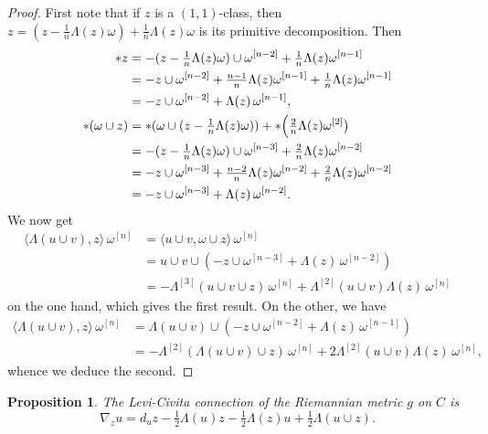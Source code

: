 \documentclass[11pt,a4paper]{amsart}
\newtheorem{prop}[theo]{Proposition}
\theoremstyle{definition}
\theoremstyle{remark}
\def\levi{\nabla}
\def\kf{\omega}
\def\Lef{\Lambda}
\def\ton{u}
\def\ttw{v}
\def\tth{z}
\def\^#1{^{[#1]}}
\def\KC{C}
\begin{document}
\begin{proof}
First note that if $\tth$ is a $(1,1)$-class, then $\tth = (\tth -
\frac1n \Lef(\tth)\kf) + \frac1n \Lef(\tth) \kf$ is its primitive
decomposition. Then
\begin{align*}
* \tth 
&= -(\tth - \tfrac1n \Lef(\tth)\kf) \cup \kf\^{n-2}
+ \tfrac1n \Lef(\tth) \kf\^{n-1}
\\
&= -\tth \cup \kf\^{n-2}
+ \tfrac{n-1}{n} \Lef(\tth) \kf\^{n-1}
+ \tfrac1n \Lef(\tth) \kf\^{n-1}
\\
&= -\tth \cup \kf\^{n-2} + \Lef(\tth)\, \kf\^{n-1},
\\
*(\kf \cup \tth)
&= *( \kf \cup (\tth - \tfrac1n \Lef(\tth)\kf))
+ * \Bigl( \tfrac{2}{n} \Lef(\tth) \kf\^2 \bigr)
\\
&= -(\tth - \tfrac1n \Lef(\tth)\kf) \cup \kf\^{n-3}
+ \tfrac{2}{n} \Lef(\tth) \kf\^{n-2}
\\
&= -\tth \cup \kf\^{n-3}
+ \tfrac{n-2}{n} \Lef(\tth) \kf\^{n-2}
+ \tfrac{2}{n} \Lef(\tth) \kf\^{n-2}
\\
&= -\tth \cup \kf\^{n-3}
+ \Lef(\tth)\, \kf\^{n-2}.
\end{align*}
We now get
\begin{align*}
\langle \Lef(\ton \cup \ttw), \tth \rangle \,\kf\^n
&= \langle \ton \cup \ttw, \kf \cup \tth \rangle \,\kf\^n
\\
&= \ton \cup \ttw \cup 
(-\tth \cup \kf\^{n-3} + \Lef(\tth)\, \kf\^{n-2})
\\
&= - \Lef\^3(\ton \cup \ttw \cup \tth) \,\kf\^n
+ \Lef\^2(\ton \cup \ttw) \Lef(\tth) \,\kf\^n
\end{align*}
on the one hand, which gives the first result. On the other, we have
\begin{align*}
\langle \Lef(\ton \cup \ttw), \tth \rangle \,\kf\^n
&= \Lef(\ton \cup \ttw) \cup 
(-\tth \cup \kf\^{n-2} + \Lef(\tth)\, \kf\^{n-1})
\\
&= - \Lef\^2(\Lef(\ton \cup \ttw) \cup \tth) \,\kf\^{n}
+ 2 \Lef\^2(\ton \cup \ttw) \Lef(\tth) \,\kf\^{n},
\end{align*}
whence we deduce the second.
\end{proof}


\begin{prop}
\label{prop:connection}
The Levi-Civita connection of the Riemannian metric $g$ on $\KC$ is
$$
\levi_{\tth} \ton
=
d_u \tth
-\tfrac12 \Lef(\ton) \tth
-\tfrac12 \Lef(\tth) \ton
+\tfrac12 \Lef(\ton \cup \tth).
$$
\end{prop}
\end{document}
